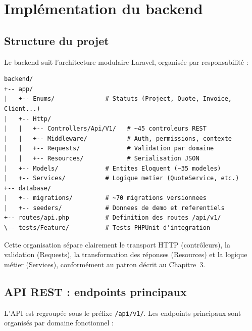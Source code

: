 \section{Implémentation du backend}

\subsection{Structure du projet}

Le backend suit l'architecture modulaire Laravel, organisée par responsabilité :

\begin{verbatim}
backend/
+-- app/
|   +-- Enums/              # Statuts (Project, Quote, Invoice, Client...)
|   +-- Http/
|   |   +-- Controllers/Api/V1/   # ~45 controleurs REST
|   |   +-- Middleware/           # Auth, permissions, contexte
|   |   +-- Requests/             # Validation par domaine
|   |   +-- Resources/            # Serialisation JSON
|   +-- Models/             # Entites Eloquent (~35 modeles)
|   +-- Services/           # Logique metier (QuoteService, etc.)
+-- database/
|   +-- migrations/         # ~70 migrations versionnees
|   +-- seeders/            # Donnees de demo et referentiels
+-- routes/api.php          # Definition des routes /api/v1/
\-- tests/Feature/          # Tests PHPUnit d'integration
\end{verbatim}

Cette organisation sépare clairement le transport HTTP (contrôleurs), la validation
(Requests), la transformation des réponses (Resources) et la logique métier (Services),
conformément au patron décrit au Chapitre~3.

\subsection{API REST : endpoints principaux}

L'API est regroupée sous le préfixe \texttt{/api/v1/}. Les endpoints principaux sont
organisés par domaine fonctionnel :

